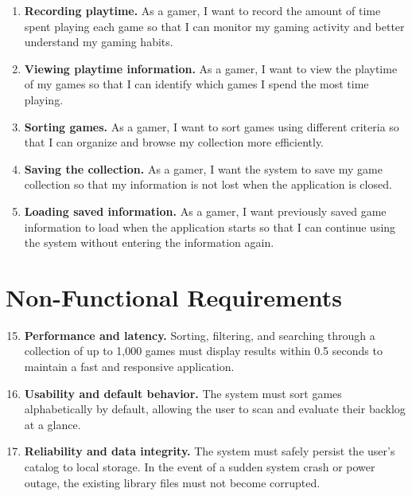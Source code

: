 \documentclass[11pt,a4paper]{report}
\begin{document}
\begin{enumerate}
      \item \textbf{Recording playtime.}
            As a gamer, I want to record the amount of time spent playing each game
            so that I can monitor my gaming activity and better understand my
            gaming habits.

      \item \textbf{Viewing playtime information.}
            As a gamer, I want to view the playtime of my games so that I can
            identify which games I spend the most time playing.

      \item \textbf{Sorting games.}
            As a gamer, I want to sort games using different criteria so that I can
            organize and browse my collection more efficiently.

      \item \textbf{Saving the collection.}
            As a gamer, I want the system to save my game collection so that my
            information is not lost when the application is closed.

      \item \textbf{Loading saved information.}
            As a gamer, I want previously saved game information to load when the
            application starts so that I can continue using the system without
            entering the information again.
\end{enumerate}

\section{Non-Functional Requirements}

\begin{enumerate}
      \setcounter{enumi}{14}

      \item \textbf{Performance and latency.}
            Sorting, filtering, and searching through a collection of up to
            1,000 games must display results within 0.5 seconds to maintain a fast
            and responsive application.

      \item \textbf{Usability and default behavior.}
            The system must sort games alphabetically by default, allowing the user
            to scan and evaluate their backlog at a glance.

      \item \textbf{Reliability and data integrity.}
            The system must safely persist the user's catalog to local storage.
            In the event of a sudden system crash or power outage, the existing
            library files must not become corrupted.
\end{enumerate}
\end{document}
